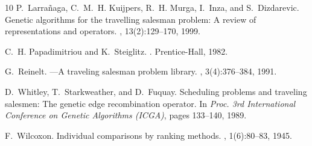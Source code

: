 \documentclass[10pt,a4paper]{article}
\begin{document}
\begin{thebibliography}{10}
P.~Larra{\~n}aga, C.~M.~H. Kuijpers, R.~H. Murga, I.~Inza, and S.~Dizdarevic.
\newblock Genetic algorithms for the travelling salesman problem: A review of representations and operators.
, 13(2):129--170, 1999.

C.~H. Papadimitriou and K.~Steiglitz.
.
\newblock Prentice-Hall, 1982.

G.~Reinelt.
---{A} traveling salesman problem library.
, 3(4):376--384, 1991.

D.~Whitley, T.~Starkweather, and D.~Fuquay.
\newblock Scheduling problems and traveling salesmen: The genetic edge recombination operator.
\newblock In {\em Proc. 3rd International Conference on Genetic Algorithms (ICGA)}, pages 133--140, 1989.

F.~Wilcoxon.
\newblock Individual comparisons by ranking methods.
, 1(6):80--83, 1945.

\end{thebibliography}
\endgroup
\end{document}
